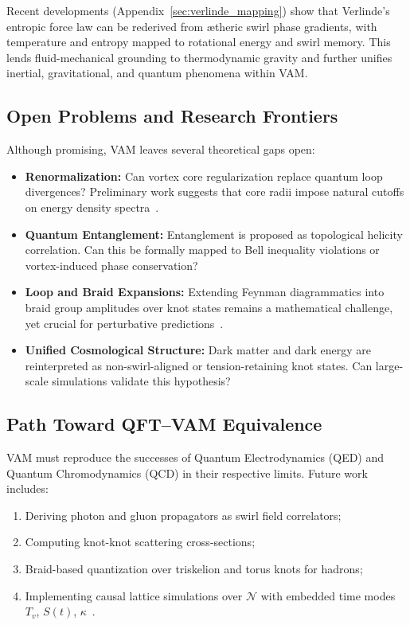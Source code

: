 \documentclass[preprint]{revtex4-2}
\begin{document}
        Recent developments (Appendix~\ref{sec:verlinde_mapping}) show that Verlinde’s entropic force law can be rederived from ætheric swirl phase gradients, with temperature and entropy mapped to rotational energy and swirl memory. This lends fluid-mechanical grounding to thermodynamic gravity and further unifies inertial, gravitational, and quantum phenomena within VAM.

    \subsection{Open Problems and Research Frontiers}
    Although promising, VAM leaves several theoretical gaps open:

    \begin{itemize}
        \item \textbf{Renormalization:} Can vortex core regularization replace quantum loop divergences? Preliminary work suggests that core radii impose natural cutoffs on energy density spectra~\cite{kleckner2013knots, moffatt1969knottedness}.
        \item \textbf{Quantum Entanglement:} Entanglement is proposed as topological helicity correlation. Can this be formally mapped to Bell inequality violations or vortex-induced phase conservation?
        \item \textbf{Loop and Braid Expansions:} Extending Feynman diagrammatics into braid group amplitudes over knot states remains a mathematical challenge, yet crucial for perturbative predictions~\cite{kleckner2013knots}.
        \item \textbf{Unified Cosmological Structure:} Dark matter and dark energy are reinterpreted as non-swirl-aligned or tension-retaining knot states. Can large-scale simulations validate this hypothesis?~\cite{verlinde2011origin}
    \end{itemize}

    \subsection*{Path Toward QFT–VAM Equivalence}
    VAM must reproduce the successes of Quantum Electrodynamics (QED) and Quantum Chromodynamics (QCD) in their respective limits. Future work includes:

    \begin{enumerate}
        \item Deriving photon and gluon propagators as swirl field correlators;
        \item Computing knot-knot scattering cross-sections;
        \item Braid-based quantization over triskelion and torus knots for hadrons;
        \item Implementing causal lattice simulations over $\mathcal{N}$ with embedded time modes $T_v$, $S(t)$, $\kappa$~\cite{moffatt1969knottedness}.
    \end{enumerate}
\end{document}
